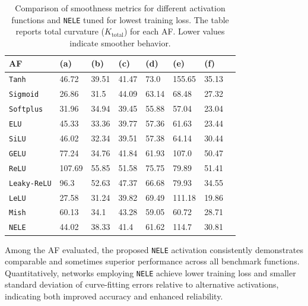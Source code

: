 \documentclass{article}
\begin{document}
\begin{table}
\centering
  \caption{Comparison of smoothness metrics for different activation functions and \texttt{NELE} tuned for lowest training loss. 
The table reports total curvature ($K_\text{total}$) for each AF. 
Lower values indicate smoother behavior.}
  \label{tab:smooth}
  \begin{tabular}{@{}llllllll@{}}
    \toprule
    AF & (a) & (b) & (c) & (d) & (e) & (f) \\
    \midrule
    \texttt{Tanh} & 46.72 & 39.51 & 41.47 & 73.0 & 155.65 & 35.13 \\ 
    \texttt{Sigmoid} & 26.86 & 31.5 & 44.09 & 63.14 & 68.48 & 27.32 \\ 
    \texttt{Softplus} & 31.96 & 34.94 & 39.45 & 55.88 & 57.04 & 23.04 \\ 
    \texttt{ELU} & 45.33 & 33.36 & 39.77 & 57.36 & 61.63 & 23.44 \\ 
    \texttt{SiLU} & 46.02 & 32.34 & 39.51 & 57.38 & 64.14 & 30.44 \\ 
    \texttt{GELU} & 77.24 & 34.76 & 41.84 & 61.93 & 107.0 & 50.47 \\ 
    \texttt{ReLU} & 107.69 & 55.85 & 51.58 & 75.75 & 79.89 & 51.41 \\ 
    \texttt{Leaky-ReLU} & 96.3 & 52.63 & 47.37 & 66.68 & 79.93 & 34.55 \\ 
    \texttt{LeLU} & 27.58 & 31.24 & 39.82 & 69.49 & 111.18 & 19.86 \\ 
    \texttt{Mish} & 60.13 & 34.1 & 43.28 & 59.05 & 60.72 & 28.71 \\ 
    \texttt{NELE} & 44.02 & 38.33 & 41.4 & 61.62 & 114.7 & 30.81 \\ 
  \bottomrule
\end{tabular}
\end{table}

Among the AF evaluated, the proposed \texttt{NELE} activation 
consistently demonstrates comparable and sometimes superior performance across all benchmark functions. 
Quantitatively, networks employing \texttt{NELE} achieve lower training loss and smaller 
standard deviation of curve-fitting errors relative to alternative activations, 
indicating both improved accuracy and enhanced reliability.
\end{document}
